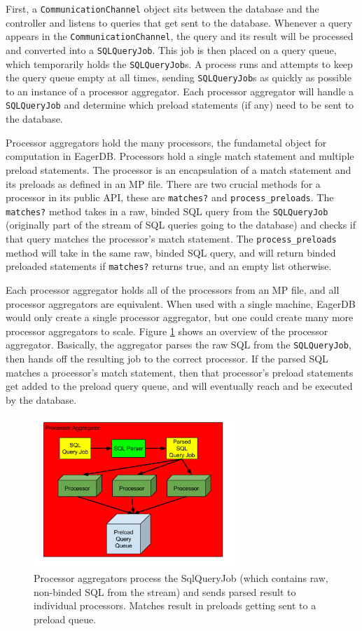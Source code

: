 \documentclass[12pt]{article}
\begin{document}
First, a \texttt{CommunicationChannel} object sits between the database and the controller and listens to queries that get sent to the database. Whenever a query appears in the \texttt{CommunicationChannel}, the query and its result will be processed and converted into a \texttt{SQLQueryJob}. This job is then placed on a query queue, which temporarily holds the \texttt{SQLQueryJob}s. A process runs and attempts to keep the query queue empty at all times, sending \texttt{SQLQueryJob}s as quickly as possible to an instance of a processor aggregator. Each processor aggregator will handle a \texttt{SQLQueryJob} and determine which preload statements (if any) need to be sent to the database.

Processor aggregators hold the many processors, the fundametal object for computation in EagerDB. Processors hold a single match statement and multiple preload statements. The processor is an encapsulation of a match statement and its preloads as defined in an MP file. There are two crucial methods for a processor in its public API, these are \texttt{matches?} and \texttt{process\_preloads}. The \texttt{matches?} method takes in a raw, binded SQL query from the \texttt{SQLQueryJob} (originally part of the stream of SQL queries going to the database) and checks if that query matches the processor's match statement. The \texttt{process\_preloads} method will take in the same raw, binded SQL query, and will return binded preloaded statements if \texttt{matches?} returns true, and an empty list otherwise.

Each processor aggregator holds all of the processors from an MP file, and all processor aggregators are equivalent. When used with a single machine, EagerDB would only create a single processor aggregator, but one could create many more processor aggregators to scale. Figure \ref{fig:processor-aggregator} shows an overview of the processor aggregator. Basically, the aggregator parses the raw SQL from the \texttt{SQLQueryJob}, then hands off the resulting job to the correct processor. If the parsed SQL matches a processor's match statement, then that processor's preload statements get added to the preload query queue, and will eventually reach and be executed by the database.

\begin{figure}[h]
  \centering
  \includegraphics[width=3in]{figures/processor_aggregator.png}
  \caption{\label{fig:processor-aggregator}Processor aggregators process the SqlQueryJob (which contains raw, non-binded SQL from the stream) and sends parsed result to individual processors. Matches result in preloads getting sent to a preload queue.}
\end{figure}
\end{document}
